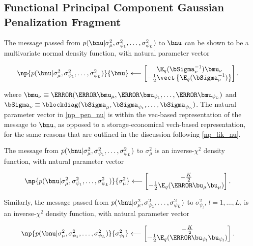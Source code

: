 \documentclass[12pt]{article}
\def\Sigmanu{\bSigma_{\nu}}
\def\munu{\bmu_{\nu}}
\def\sigsqmu{\sigma^2_{\mu}}
\def\mumu{\bmu_\mu}
\def\umu{\bu_\mu}
\newcommand\upsi[1]{\bu_{\psi_{#1}}}
\newcommand\sigsqpsi[1]{\sigma^2_{\psi_{#1}}}
\newcommand\mupsi[1]{\bmu_{\psi_#1}}
\theoremstyle{plain}
\theoremstyle{definition}
\theoremstyle{remark}
\begin{document}

\subsection{Functional Principal Component Gaussian Penalization Fragment}
\label{sec:mean_fpc_gauss_pen_frag}

The message passed from $p (\bnu | \sigsqmu, \sigsqpsi{1}, \dots, \sigsqpsi{L})$ to $\bnu$ can be shown to
be a multivariate normal density function, with natural parameter vector

\begin{equation}
	\np{p (\bnu | \sigsqmu, \sigsqpsi{1}, \dots, \sigsqpsi{L})}{\bnu}
		\longleftarrow
			\begin{bmatrix}
				\E_q (\Sigmanu^{-1}) \munu \\
				-\frac12 \vect \left\{ \E_q (\Sigmanu^{-1}) \right\}
			\end{bmatrix}.
\label{np_pen_nu}
\end{equation}

\noindent where $\munu \equiv \T{(\T{\mumu}, \T{\mupsi{1}}, \dots, \T{\mupsi{L}})}$ and
$\Sigmanu \equiv \blockdiag (\bSigma_\mu, \bSigma_{\psi_1}, \dots, \bSigma_{\psi_L})$.
The natural parameter vector in \eqref{np_pen_nu} is within the
vec-based representation of the message to $\bnu$, as opposed to
a storage-economical vech-based representation, for the same reasons that are outlined in the discussion
following \eqref{np_lik_nu}.

The message from $p (\bnu | \sigsqmu, \sigsqpsi{1}, \dots, \sigsqpsi{L})$ to $\sigsqmu$ is an inverse-$\chi^2$
density function, with natural parameter vector

\begin{equation}
	\np{p (\bnu | \sigsqmu, \sigsqpsi{1}, \dots, \sigsqpsi{L})}{\sigsqmu}
		\longleftarrow
			\begin{bmatrix}
				-\frac{K}{2} \\
				-\frac12 \E_q (\T{\umu} \umu)
			\end{bmatrix}.
\label{np_pen_sigsqmu}
\end{equation}

Similarly, the message passed from $p (\bnu | \sigsqmu, \sigsqpsi{1}, \dots, \sigsqpsi{L})$ to $\sigsqpsi{l}$,
$l = 1, \dots, L$, is an inverse-$\chi^2$ density function, with natural parameter vector

\begin{equation}
	\np{p (\bnu | \sigsqmu, \sigsqpsi{1}, \dots, \sigsqpsi{L})}{\sigsqpsi{l}}
		\longleftarrow
			\begin{bmatrix}
				-\frac{K}{2} \\
				-\frac12 \E_q (\T{\upsi{l}} \upsi{l})
			\end{bmatrix}.
\label{np_pen_sigsqpsi}
\end{equation}
\end{document}
